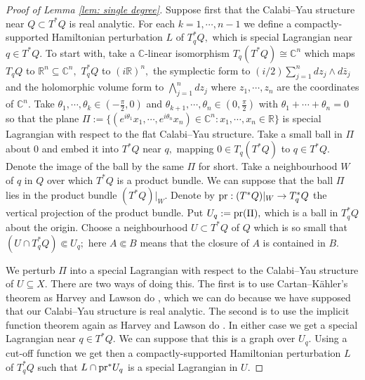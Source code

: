 \documentclass{article}
\theoremstyle{plain}%
\theoremstyle{definition}
\numberwithin{equation}{section}
\numberwithin{figure}{section}
\def\C{{\mathbin{\mathbb C}}}\def\N{{\mathbb N}}
\def\R{{\mathbin{\mathbb R}}}
\def\th{\theta}
\def\bw{\bigwedge}
\def\w{\wedge}
\def\sb{\subseteq}
\begin{document}
\begin{proof}[Proof of Lemma \ref{lem: single degree}]
Suppose first that the Calabi--Yau structure near $Q\subset T^*Q$ is real analytic.
For each $k=1,\cdots,n-1$ we define a compactly-supported Hamiltonian perturbation $L$ of $T_q^*Q,$ which is special Lagrangian near $q\in T^*Q.$ 
To start with, take a $\C$-linear isomorphism $T_q(T^*Q)\cong\C^n$ which maps $T_qQ$ to $\R^n\sb\C^n,$ $T_q^*Q$ to $(i\R)^n,$ the symplectic form to $(i/2)\sum_{j=1}^ndz_j\w d\bar{z}_j$ and the holomorphic volume form to $\bw_{j=1}^ndz_j$ where $z_1,\cdots,z_n$ are the coordinates of $\C^n.$
Take $\th_1,\cdots,\th_k\in(-\frac\pi2,0)$ and $\th_{k+1},\cdots,\th_n\in(0,\frac\pi2)$ with
$\th_1+\cdots+\th_n=0$ so that the plane
$\Pi:=\{(e^{i\th_1}x_1,\cdots,e^{i\th_n}x_n)\in\C^n:x_1,\cdots,x_n\in\R\}$
is special Lagrangian with respect to the flat Calabi--Yau structure.
Take a small ball in $\Pi$ about $0$ and embed it into $T^*Q$ near $q,$ mapping $0\in T_q(T^*Q)$ to $q\in T^*Q.$
Denote the image of the ball by the same $\Pi$ for short.
Take a neighbourhood $W$ of $q$ in $Q$ over which $T^*Q$ is a product bundle.
We can suppose that the ball $\Pi$ lies in the product bundle $(T^*Q)|_W.$
Denote by ${\rm pr}:(T^*Q)|_W\to T_q^*Q$ the vertical projection of the product bundle.
Put $U_q:={\rm pr}(\Pi),$ which is a ball in $T_q^*Q$ about the origin. 
Choose a neighbourhood $U\subset T^*Q$ of $Q$ which is so small that $(U\cap T_q^*Q)\Subset U_q;$ here $A\Subset B$ means that the closure of $A$ is contained in $B.$

We perturb $\Pi$ into a special Lagrangian with respect to the Calabi--Yau structure of $U\sb X.$ 
There are two ways of doing this.
The first is to use Cartan--K\"ahler's theorem as Harvey and Lawson do \cite[Chapter III, Proof of Theorem 5.5]{HL}, which we can do because we have supposed that our Calabi--Yau structure is real analytic.
The second is to use the implicit function theorem again as Harvey and Lawson do \cite[Chapter III, Proof of Corollary 2.14]{HL}.
In either case we get a special Lagrangian near $q\in T^*Q.$
We can suppose that this is a graph over $U_q.$
Using a cut-off function we get then a compactly-supported Hamiltonian perturbation $L$ of $T_q^*Q$ such that $L\cap {\rm pr}^*U_q$ is a special Lagrangian in $U.$


\end{proof}
\end{document}

